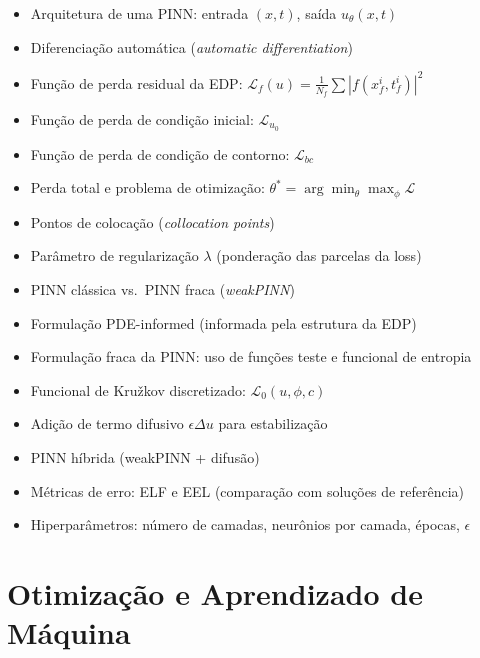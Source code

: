 \documentclass[12pt, a4paper]{article}
\begin{document}
\begin{itemize}
    \item Arquitetura de uma PINN: entrada $(x,t)$, saída $u_\theta(x,t)$
    \item Diferenciação automática (\textit{automatic differentiation})
    \item Função de perda residual da EDP: $\mathcal{L}_f(u) = \frac{1}{N_f}\sum |f(x_f^i, t_f^i)|^2$
    \item Função de perda de condição inicial: $\mathcal{L}_{u_0}$
    \item Função de perda de condição de contorno: $\mathcal{L}_{bc}$
    \item Perda total e problema de otimização: $\theta^* = \arg\min_\theta \max_\phi \mathcal{L}$
    \item Pontos de colocação (\textit{collocation points})
    \item Parâmetro de regularização $\lambda$ (ponderação das parcelas da loss)
    \item PINN clássica vs.\ PINN fraca (\textit{weakPINN})
    \item Formulação PDE-informed (informada pela estrutura da EDP)
    \item Formulação fraca da PINN: uso de funções teste e funcional de entropia
    \item Funcional de Kru\v{z}kov discretizado: $\mathcal{L}_0(u, \phi, c)$
    \item Adição de termo difusivo $\epsilon \Delta u$ para estabilização
    \item PINN híbrida (weakPINN + difusão)
    \item Métricas de erro: ELF e EEL (comparação com soluções de referência)
    \item Hiperparâmetros: número de camadas, neurônios por camada, épocas, $\epsilon$
\end{itemize}

\section*{Otimização e Aprendizado de Máquina}
\end{document}
